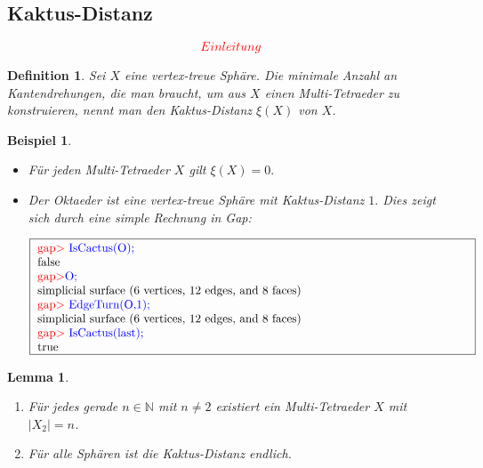 \documentclass[12pt,titlepage,twoside,cleardoublepage]{article}
\theoremstyle{nummermitklammern}
\newtheorem{lemma}[temp]{Lemma}
\newtheorem{bsp}[temp]{Beispiel}
\newtheorem{definition}[temp]{Definition}
\newtheorem{definition}[zahl]{Definition}
\newtheorem{lemma}[zahl]{Lemma}
\newtheorem{bsp}[zahl]{Beispiel}
\numberwithin{equation}{section}
\begin{document}
\subsection{Kaktus-Distanz}
\[
\textcolor{red}{Einleitung}
\]
\begin{definition}
Sei $X$ eine vertex-treue Sphäre. Die minimale Anzahl an Kantendrehungen, die man braucht, um aus $X$ einen Multi-Tetraeder zu  konstruieren, nennt man den \emph{Kaktus-Distanz} $\xi(X)$ von $X$.
\end{definition}
\begin{bsp}
\begin{itemize}
\item Für jeden Multi-Tetraeder $X$ gilt $\xi(X)=0.$
\item Der Oktaeder ist eine vertex-treue Sphäre mit Kaktus-Distanz $1.$ Dies zeigt sich durch eine simple Rechnung in Gap:
\begin{center}
$\fbox{
\parbox{13cm}{
\textcolor{red}{gap$>$} \textcolor{blue}{IsCactus(O);}\\
false\\
\textcolor{red}{gap$>$}\textcolor{blue}{ O;}\\
simplicial surface (6 vertices, 12 edges, and 8 faces)\\
\textcolor{red}{gap$>$} \textcolor{blue}{EdgeTurn(O,1);}\\
simplicial surface (6 vertices, 12 edges, and 8 faces)\\
\textcolor{red}{gap$>$} \textcolor{blue}{IsCactus(last);}\\
true
}}$
\end{center}
\end{itemize}
\end{bsp}
\begin{lemma}
\begin{enumerate}
\item
Für jedes gerade $n \in \mathbb{N}$ mit $n \neq 2$ existiert ein Multi-Tetraeder $X$ mit $\vert X_2\vert=n$.
\item
Für alle Sphären ist die Kaktus-Distanz endlich.
\end{enumerate} 
\end{lemma}
\end{document}
